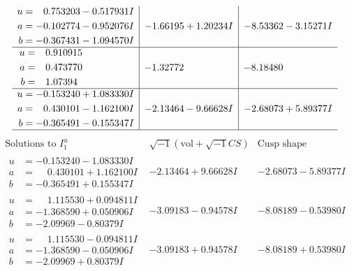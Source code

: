 \documentclass[1p]{elsarticle_modified}
\theoremstyle{definition}
\newcommand{\I}{\sqrt{-1}}
\begin{document}
$$\begin{array}{c|c|c}
\begin{aligned}
u &= \phantom{-}0.753203 - 0.517931 I \\
a &= -0.102774 - 0.952076 I \\
b &= -0.367431 - 1.094570 I\end{aligned}
 & -1.66195 + 1.20234 I & -8.53362 - 3.15271 I \\ \hline\begin{aligned}
u &= \phantom{-}0.910915\phantom{ +0.000000I} \\
a &= \phantom{-}0.473770\phantom{ +0.000000I} \\
b &= \phantom{-}1.07394\phantom{ +0.000000I}\end{aligned}
 & -1.32772\phantom{ +0.000000I} & -8.18480\phantom{ +0.000000I} \\ \hline\begin{aligned}
u &= -0.153240 + 1.083330 I \\
a &= \phantom{-}0.430101 - 1.162100 I \\
b &= -0.365491 - 0.155347 I\end{aligned}
 & -2.13464 - 9.66628 I & -2.68073 + 5.89377 I\\
 \hline 
 \end{array}$$\newpage$$\begin{array}{c|c|c}  
\text{Solutions to }I^u_{1}& \I (\text{vol} + \sqrt{-1}CS) & \text{Cusp shape}\\
 \hline 
\begin{aligned}
u &= -0.153240 - 1.083330 I \\
a &= \phantom{-}0.430101 + 1.162100 I \\
b &= -0.365491 + 0.155347 I\end{aligned}
 & -2.13464 + 9.66628 I & -2.68073 - 5.89377 I \\ \hline\begin{aligned}
u &= \phantom{-}1.115530 + 0.094811 I \\
a &= -1.368590 + 0.050906 I \\
b &= -2.09969 - 0.80379 I\end{aligned}
 & -3.09183 - 0.94578 I & -8.08189 - 0.53980 I \\ \hline\begin{aligned}
u &= \phantom{-}1.115530 - 0.094811 I \\
a &= -1.368590 - 0.050906 I \\
b &= -2.09969 + 0.80379 I\end{aligned}
 & -3.09183 + 0.94578 I & -8.08189 + 0.53980 I \\ \hline\begin{aligned}

\end{aligned}
\end{array}$$
\end{document}
